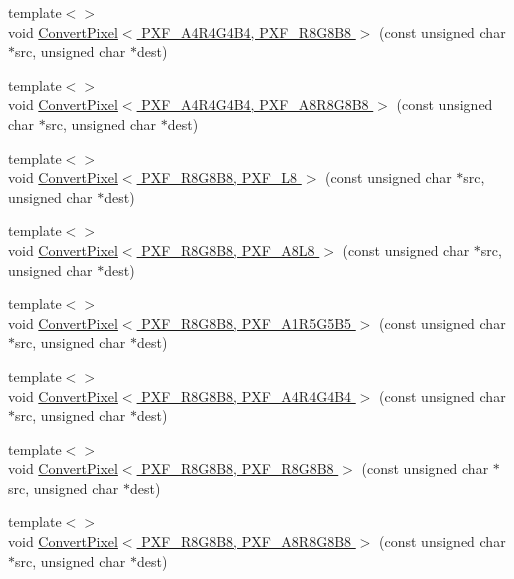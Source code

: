 \begin{DoxyCompactItemize}
{\footnotesize template$<$$>$ }\\void \hyperlink{_convert_pixel_8inl_a75ceab650b655cd39070466918bf8b1a}{Convert\+Pixel$<$ P\+X\+F\+\_\+\+A4\+R4\+G4\+B4, P\+X\+F\+\_\+\+R8\+G8\+B8 $>$} (const unsigned char $\ast$src, unsigned char $\ast$dest)
\item 
{\footnotesize template$<$$>$ }\\void \hyperlink{_convert_pixel_8inl_a41e17a0867d87828ed1d5705ccd90293}{Convert\+Pixel$<$ P\+X\+F\+\_\+\+A4\+R4\+G4\+B4, P\+X\+F\+\_\+\+A8\+R8\+G8\+B8 $>$} (const unsigned char $\ast$src, unsigned char $\ast$dest)
\item 
{\footnotesize template$<$$>$ }\\void \hyperlink{_convert_pixel_8inl_a9407a2cb0eec9cf3f9fa6fad051219fd}{Convert\+Pixel$<$ P\+X\+F\+\_\+\+R8\+G8\+B8, P\+X\+F\+\_\+\+L8 $>$} (const unsigned char $\ast$src, unsigned char $\ast$dest)
\item 
{\footnotesize template$<$$>$ }\\void \hyperlink{_convert_pixel_8inl_a3aa0d709692fbe2b99db5f3ef803d369}{Convert\+Pixel$<$ P\+X\+F\+\_\+\+R8\+G8\+B8, P\+X\+F\+\_\+\+A8\+L8 $>$} (const unsigned char $\ast$src, unsigned char $\ast$dest)
\item 
{\footnotesize template$<$$>$ }\\void \hyperlink{_convert_pixel_8inl_a2afd6cba518e0ff2bb2c1315faa2f835}{Convert\+Pixel$<$ P\+X\+F\+\_\+\+R8\+G8\+B8, P\+X\+F\+\_\+\+A1\+R5\+G5\+B5 $>$} (const unsigned char $\ast$src, unsigned char $\ast$dest)
\item 
{\footnotesize template$<$$>$ }\\void \hyperlink{_convert_pixel_8inl_a03961d827bf07c392d43082b616303f8}{Convert\+Pixel$<$ P\+X\+F\+\_\+\+R8\+G8\+B8, P\+X\+F\+\_\+\+A4\+R4\+G4\+B4 $>$} (const unsigned char $\ast$src, unsigned char $\ast$dest)
\item 
{\footnotesize template$<$$>$ }\\void \hyperlink{_convert_pixel_8inl_a6715830f488a09bbe4cfd7343843ffc5}{Convert\+Pixel$<$ P\+X\+F\+\_\+\+R8\+G8\+B8, P\+X\+F\+\_\+\+R8\+G8\+B8 $>$} (const unsigned char $\ast$src, unsigned char $\ast$dest)
\item 
{\footnotesize template$<$$>$ }\\void \hyperlink{_convert_pixel_8inl_ae32d8e6b9ece53522851db0e9bd8f6e7}{Convert\+Pixel$<$ P\+X\+F\+\_\+\+R8\+G8\+B8, P\+X\+F\+\_\+\+A8\+R8\+G8\+B8 $>$} (const unsigned char $\ast$src, unsigned char $\ast$dest)
\item 

\end{DoxyCompactItemize}
